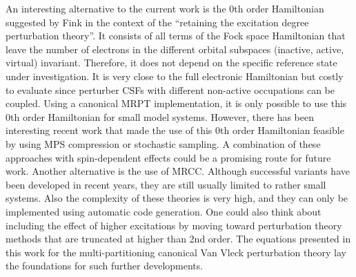 An interesting alternative to the current work is the 0th order Hamiltonian suggested by Fink in the context of the ``retaining the excitation degree perturbation theory''.\cite{Fink_2006_461, Fink_2009_39} It consists of all terms of the Fock space Hamiltonian that leave the number of electrons in the different orbital subspaces (inactive, active, virtual) invariant. Therefore, it does not depend on the specific reference state under investigation. It is very close to the full electronic Hamiltonian but costly to evaluate since perturber CSFs with different non-active occupations can be coupled. Using a canonical MRPT implementation, it is only possible to use this 0th order Hamiltonian for small model systems. However, there has been interesting recent work that made the use of this 0th order Hamiltonian feasible by using MPS compression\cite{SharmJA_2016_34103}\cite{SharmA_2015_102815} or stochastic sampling.\cite{JeanmSA_2017_44107} A combination of these approaches with spin-dependent effects could be a promising route for future work.
Another alternative is the use of MRCC. Although successful variants have been developed in recent years, they are still usually limited to rather small systems. Also the complexity of these theories is very high, and they can only be implemented using automatic code generation.\cite{KoehnHMJG_2013_176} One could also think about including the effect of higher excitations by moving toward perturbation theory methods that are truncated at higher than 2nd order. The equations presented in this work for the multi-partitioning canonical Van Vleck perturbation theory lay the foundations for such further developments.

